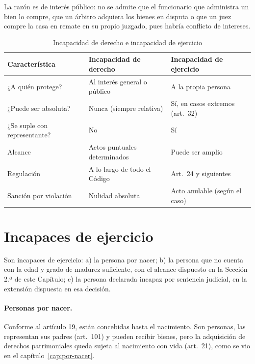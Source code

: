 \documentclass[12pt,oneside]{book}
\begin{document}
La razón es de interés público: no se admite que el funcionario que administra un bien lo compre, que un árbitro adquiera los bienes en disputa o que un juez compre la casa en remate en su propio juzgado, pues habría conflicto de intereses.

\begin{table}[H]
\centering
\begin{tabularx}{\textwidth}{B{0.26\textwidth} Y Y}
\toprule
\textbf{Característica} & \textbf{Incapacidad de derecho} & \textbf{Incapacidad de ejercicio} \\
\midrule
¿A quién protege? & Al interés general o público & A la propia persona \\
¿Puede ser absoluta? & Nunca (siempre relativa) & Sí, en casos extremos (art.~32) \\
¿Se suple con representante? & No & Sí \\
Alcance & Actos puntuales determinados & Puede ser amplio \\
Regulación & A lo largo de todo el Código & Art.~24 y siguientes \\
Sanción por violación & Nulidad absoluta & Acto anulable (según el caso) \\
\bottomrule
\end{tabularx}
\caption{Incapacidad de derecho e incapacidad de ejercicio}
\end{table}

\section{Incapaces de ejercicio}

\begin{regla}
Son incapaces de ejercicio: a) la persona por nacer; b) la persona que no cuenta con la edad y grado de madurez suficiente, con el alcance dispuesto en la Sección 2.ª de este Capítulo; c) la persona declarada incapaz por sentencia judicial, en la extensión dispuesta en esa decisión.
\end{regla}

\paragraph{Personas por nacer.} Conforme al artículo 19, están concebidas hasta el nacimiento. Son personas, las representan sus padres (art.~101) y pueden recibir bienes, pero la adquisición de derechos patrimoniales queda sujeta al nacimiento con vida (art.~21), como se vio en el capítulo~\ref{cap:por-nacer}.
\end{document}

